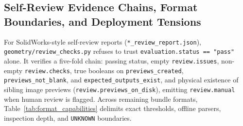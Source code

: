 \documentclass[nocopyright,nolists,upint,varvw,hyphenate]{asmejour}
\begin{document}
\subsection{Self-Review Evidence Chains, Format Boundaries, and Deployment Tensions}\label{sec:multiformat}

For SolidWorks-style self-review reports (\texttt{*\_review\_report.json}), \texttt{geometry/review\_checks.py} refuses to trust \texttt{evaluation.status == "pass"} alone. It verifies a five-fold chain: passing status, empty \texttt{review.issues}, non-empty \texttt{review.checks}, true booleans on \texttt{previews\_created}, \texttt{previews\_not\_blank}, and \texttt{expected\_outputs\_exist}, and physical existence of sibling image previews (\texttt{review.previews\_on\_disk}), emitting \texttt{review.manual} when human review is flagged. Across remaining bundle formats, Table~\ref{tab:format_capabilities} delimits exact thresholds, offline parsers, inspection depth, and \texttt{UNKNOWN} boundaries.
\end{document}
